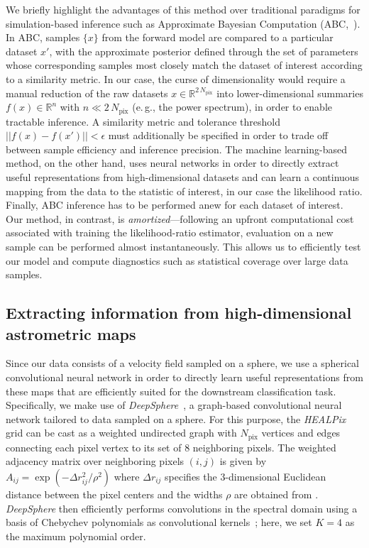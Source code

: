 \documentclass[twocolumn]{aastex631}
\newcommand{\package}[1]{\textsl{#1}\xspace}
\newcommand{\eg}{{e.\,g.}\xspace}
\newcommand{\healpix}{\package{HEALPix}}
\newcommand{\deepsphere}{\package{DeepSphere}}
\begin{document}
{We briefly highlight the advantages of this method over traditional paradigms for simulation-based inference such as Approximate Bayesian Computation (ABC,~\citet{10.1214/aos/1176346785,sisson2018handbook}). In ABC, samples $\{x\}$ from the forward model are compared to a particular dataset $x'$, with the approximate posterior defined through the set of parameters whose corresponding samples most closely match the dataset of interest according to a similarity metric. In our case, the curse of dimensionality would require a manual reduction of the raw datasets $x\in\mathbb R^{2\,N_\mathrm{pix}}$ into lower-dimensional summaries $f(x)\in\mathbb R^{n}$ with $n \ll 2\,N_\mathrm{pix}$ (\eg, the power spectrum), in order to enable tractable inference. A similarity metric and tolerance threshold $||f(x)-f(x')|| < \epsilon$ must additionally be specified in order to trade off between sample efficiency and inference precision. The machine learning-based method, on the other hand, uses neural networks in order to directly extract useful representations from high-dimensional datasets and can learn a continuous mapping from the data to the statistic of interest, in our case the likelihood ratio. Finally, ABC inference has to be performed anew for each dataset of interest. Our method, in contrast, is \emph{amortized}---following an upfront computational cost associated with training the likelihood-ratio estimator, evaluation on a new sample can be performed almost instantaneously. This allows us to efficiently test our model and compute diagnostics such as statistical coverage over large data samples.}

\subsection{Extracting information from high-dimensional astrometric maps} 

Since our data consists of a velocity field sampled on a sphere, we use a spherical convolutional neural network in order to directly learn useful representations from these maps that are efficiently suited for the downstream classification task. Specifically, we make use of \deepsphere~\citep{2020arXiv201215000D,deepsphere_cosmo}, a graph-based convolutional neural network tailored to data sampled on a sphere. For this purpose, the \healpix grid can be cast as a weighted undirected graph with $N_\mathrm{pix}$ vertices and edges connecting each pixel vertex to its set of 8 neighboring pixels. The weighted adjacency matrix over neighboring pixels $(i, j)$ is given by $A_{ij} = \exp \left(-{\Delta r_{ij}^{2}}/{\rho^{2}}\right)$ where $\Delta r_{ij}$ specifies the 3-dimensional Euclidean distance between the pixel centers and the widths $\rho$ are obtained from \citet{2020arXiv201215000D}. \deepsphere then efficiently performs convolutions in the spectral domain using a basis of Chebychev polynomials as convolutional kernels~\citep{2016arXiv160609375D}; here, we set $K=4$ as the maximum polynomial order. 
\end{document}
